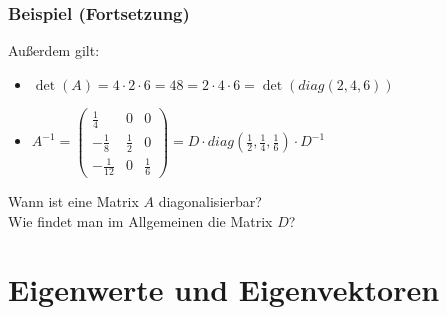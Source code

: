 %
%
\begin{frame}\frametitle{Beispiel (Fortsetzung)}
Außerdem gilt:\vfill
\begin{itemize}
\item $\det(A)=4\cdot2\cdot6=48=2\cdot4\cdot6=\det(diag(2,4,6))$ \vfill\pause
\item $A^{-1}=\begin{pmatrix}\frac{1}{4}&0&0\\-\frac{1}{8}&\frac{1}{2}&0\\-\frac{1}{12}&0&\frac{1}{6} \end{pmatrix}=D\cdot diag(\frac{1}{2},\frac{1}{4},\frac{1}{6})\cdot D^{-1}$
\end{itemize} \vfill\pause
{}\quad Wann ist eine Matrix $A$ diagonalisierbar? \\
\hspace{15.75mm}Wie findet man im Allgemeinen die Matrix $D$? 
\end{frame}
%
%
\section{Eigenwerte und Eigenvektoren}
%
